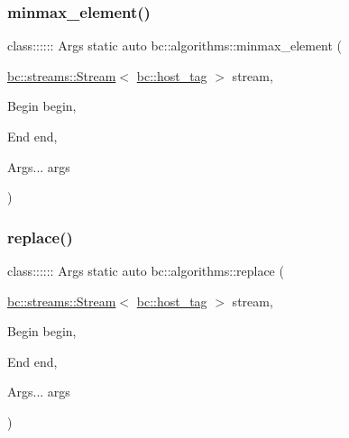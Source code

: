 \mbox{\label{namespacebc_1_1algorithms_afce1a4f97716bc7f382dd42dade0f257}} 
\subsubsection{\texorpdfstring{minmax\+\_\+element()}{minmax\_element()}}
{\footnotesize\ttfamily class\+:::::: Args static auto bc\+::algorithms\+::minmax\+\_\+element (\begin{DoxyParamCaption}\item[{\hyperlink{classbc_1_1streams_1_1Stream}{bc\+::streams\+::\+Stream}$<$ \hyperlink{structbc_1_1host__tag}{bc\+::host\+\_\+tag} $>$}]{stream,  }\item[{Begin}]{begin,  }\item[{End}]{end,  }\item[{Args...}]{args }\end{DoxyParamCaption})}

\mbox{\label{namespacebc_1_1algorithms_ac61f6fc5e5556baadc24249bc26d789f}} 
\subsubsection{\texorpdfstring{replace()}{replace()}}
{\footnotesize\ttfamily class\+:::::: Args static auto bc\+::algorithms\+::replace (\begin{DoxyParamCaption}\item[{\hyperlink{classbc_1_1streams_1_1Stream}{bc\+::streams\+::\+Stream}$<$ \hyperlink{structbc_1_1host__tag}{bc\+::host\+\_\+tag} $>$}]{stream,  }\item[{Begin}]{begin,  }\item[{End}]{end,  }\item[{Args...}]{args }\end{DoxyParamCaption})}

\mbox{\label{namespacebc_1_1algorithms_ae396db51eb91930c575f9f81bc445d3c}} 
